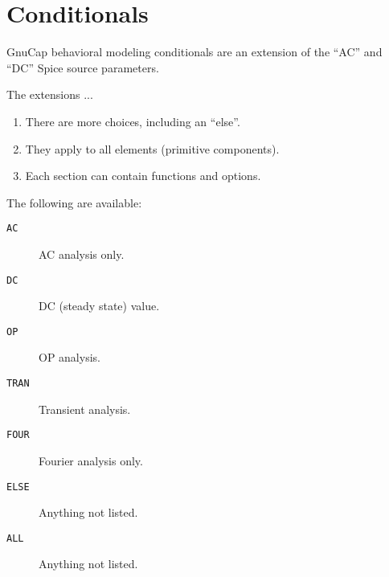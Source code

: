 %
%
%
%
\section{Conditionals}
GnuCap behavioral modeling conditionals are an extension of the ``AC''
and ``DC'' Spice source parameters.  

The extensions ...
\begin{enumerate}

\item There are more choices, including an ``else''.

\item They apply to all elements (primitive components).

\item Each section can contain functions and options.

\end{enumerate}

The following are available:

\begin{description}

\item[{\tt AC}] AC analysis only.
\item[{\tt DC}] DC (steady state) value.
\item[{\tt OP}] OP analysis.
\item[{\tt TRAN}] Transient analysis.
\item[{\tt FOUR}] Fourier analysis only.
\item[{\tt ELSE}] Anything not listed.
\item[{\tt ALL}] Anything not listed.

\end{description}

